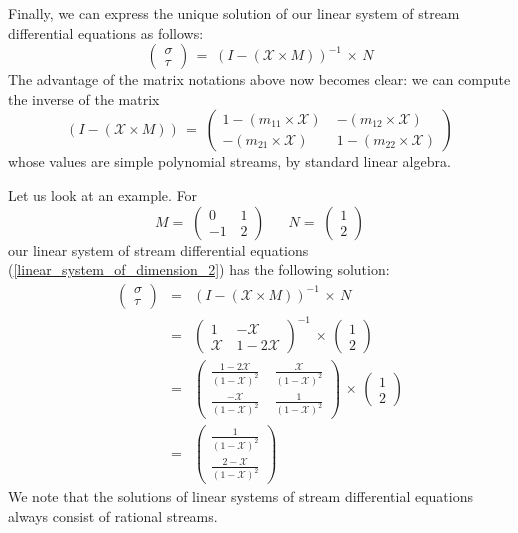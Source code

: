 \documentclass[3p]{elsarticle}
\newcommand{\cbox}[1]{\vspace{0.2cm}\noindent
  \fbox{\parbox{.97\textwidth}{#1}}\vspace{0.2cm}}
\newcommand{\X}{\mathcal{X}}           %
\newcommand{\streamproduct}{\times} %
\begin{document}
Finally, we can express the unique solution of our linear system
of stream differential equations as follows:
\[
\begin{pmatrix}%
\sigma \\ \tau
\end{pmatrix}
\, = \; (I - (\X \streamproduct M))^{-1} \, \streamproduct \, N
\]
The advantage of the matrix notations above now becomes clear:
we can compute the inverse of
the matrix
\[
(I - (\X \streamproduct M)) \, = \;
\begin{pmatrix}
1 - (m_{11} \streamproduct \X)  \; & - (m_{12} \streamproduct \X) \\
-(m_{21} \streamproduct \X) \; & 1 - (m_{22} \streamproduct \X)
\end{pmatrix}
\]
whose values are simple polynomial streams, by standard
linear algebra.

Let us look at an example. For
\[
M = \;
\begin{pmatrix}
0 \, & 1 \\ -1 \,  & 2
\end{pmatrix}
\;\;\;\;\;\;
N = \;
\begin{pmatrix}
1  \\  2
\end{pmatrix}
\]
our linear system of stream differential equations
(\ref{linear_system_of_dimension_2}) has the
following solution:
\begin{eqnarray*}
\begin{pmatrix}%
\sigma \\ \tau
\end{pmatrix}
& = & (I - (\X \streamproduct M))^{-1} \, \streamproduct \, N
\\
& = &
\begin{pmatrix}
1  \, & -  \X \\
\X \, & 1 - 2\X
\end{pmatrix}^{-1}
\, \streamproduct \,
\begin{pmatrix}
1  \\  2
\end{pmatrix}
\\
& = &
\begin{pmatrix}
\frac{1-2\X}{(1-\X)^2} \; & \frac{\X}{(1-\X)^2} \\
\frac{-\X}{(1-\X)^2} \; & \frac{1}{(1-\X)^2}
\end{pmatrix}
\, \streamproduct \,
\begin{pmatrix}
1  \\  2
\end{pmatrix}
\\
& = &
\begin{pmatrix}
\frac{1}{(1-\X)^2} \\
\frac{2-\X}{(1-\X)^2}
\end{pmatrix}
\end{eqnarray*}
We note that the solutions of linear systems of stream differential equations
always consist of rational streams.
\end{document}
